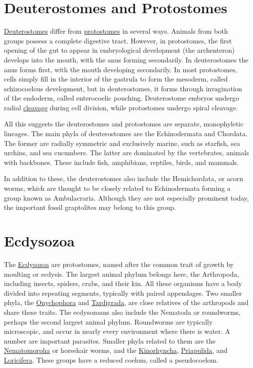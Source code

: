 \section{Deuterostomes and
Protostomes}\label{deuterostomes-and-protostomes}

\href{https://en.wikipedia.org/wiki/Deuterostome}{Deuterostomes} differ
from \href{https://en.wikipedia.org/wiki/Protostome}{protostomes} in
several ways. Animals from both groups possess a complete digestive
tract. However, in protostomes, the first opening of the gut to appear
in embryological development (the archenteron) develops into the mouth,
with the anus forming secondarily. In deuterostomes the anus forms
first, with the mouth developing secondarily. In most protostomes, cells
simply fill in the interior of the gastrula to form the mesoderm, called
schizocoelous development, but in deuterostomes, it forms through
invagination of the endoderm, called enterocoelic pouching. Deuterostome
embryos undergo radial \href{https://en.wikipedia.org/wiki/Cleavage_(embryo)}{cleavage} during cell division, while protostomes
undergo spiral cleavage.

All this suggests the deuterostomes and protostomes are separate,
monophyletic lineages. The main phyla of deuterostomes are the
Echinodermata and Chordata. The former are radially symmetric and
exclusively marine, such as starfish, sea urchins, and sea cucumbers.
The latter are dominated by the vertebrates, animals with backbones.
These include fish, amphibians, reptiles, birds, and mammals.

In addition to these, the deuterostomes also include the Hemichordata,
or acorn worms, which are thought to be closely related to Echinodermata
forming a group known as Ambulacraria. Although they are not especially
prominent today, the important fossil graptolites may belong to this
group.

\section{Ecdysozoa}\label{ecdysozoa}

The \href{https://en.wikipedia.org/wiki/Ecdysozoa}{Ecdysozoa} are
protostomes, named after the common trait of growth by moulting or
ecdysis. The largest animal phylum belongs here, the Arthropoda,
including insects, spiders, crabs, and their kin. All these organisms
have a body divided into repeating segments, typically with paired
appendages. Two smaller phyla, the \href{https://en.wikipedia.org/wiki/Onychophora}{Onychophora} and \href{https://en.wikipedia.org/wiki/Tardigrade}{Tardigrada}, are close
relatives of the arthropods and share these traits. The ecdysozoans also
include the Nematoda or roundworms, perhaps the second largest animal
phylum. Roundworms are typically microscopic, and occur in nearly every
environment where there is water. A number are important parasites.
Smaller phyla related to them are the \href{https://en.wikipedia.org/wiki/Nematomorpha}{Nematomorpha} or horsehair worms,
and the \href{https://en.wikipedia.org/wiki/Kinorhyncha}{Kinorhyncha}, \href{https://en.wikipedia.org/wiki/Priapulida}{Priapulida}, and \href{https://en.wikipedia.org/wiki/Loricifera}{Loricifera}. These groups have a
reduced coelom, called a pseudocoelom.

